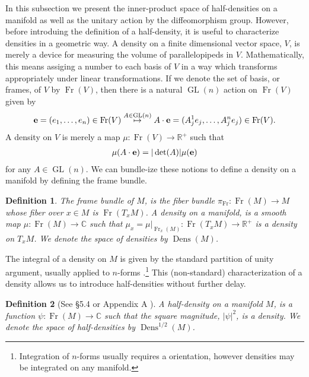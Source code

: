 \documentclass[12pt]{amsart}
\newtheorem{defn}{Definition}
\DeclareMathOperator{\GL}{GL}
\DeclareMathOperator{\Fr}{Fr}
\DeclareMathOperator{\Dens}{Dens}
\begin{document}
In this subsection we present the inner-product space of half-densities
on a manifold
as well as the unitary action by the diffeomorphism group.
However, before introduing the definition of a half-density, it is useful
to characterize densities in a geometric way.
A density on a finite dimensional vector space, $V$,
is merely a device for measuring the volume of parallelopipeds in $V$.
Mathematically, this means assiging a number to each basis of $V$
in a way which transforms appropriately under linear transformations.
If we denote the set of basis, or frames, of $V$ by $\Fr(V)$,
 then there is a natural $\GL(n)$ action on $\Fr(V)$ given by
 \begin{align*}
  {\bf e} = (e_1,\dots,e_n) \in \Fr(V) \stackrel{A \in \GL(n)}{\mapsto} A \cdot {\bf e} = (A_j^1 e_j, \dots, A_j^n e_j) \in \Fr(V).
 \end{align*}
A density on $V$ is merely a map $\mu: \Fr(V) \to \mathbb{R}^+$ such that
\begin{align*}
  \mu( A \cdot {\bf e} ) =  | \det(A) | \mu( {\bf e})
\end{align*}
for any $A \in \GL(n)$.
We can bundle-ize these notions to define a density on a manifold by defining the frame bundle.
\begin{defn}
  The \emph{frame bundle} of $M$, is the fiber bundle $\pi_{\Fr}:\Fr(M) \to M$ whose fiber over $x \in M$ is $\Fr( T_x M)$.
A \emph{density} on a manifold, is a smooth map $\mu:\Fr(M) \to \mathbb{C}$ such that $\mu_x = \left. \mu \right|_{ \Fr_x(M)} : \Fr(T_xM) \to \mathbb{R}^+$ is a density on $T_xM$.
We denote the space of densities by $\Dens(M)$.
\end{defn}
 The integral of a density on $M$ is given by the standard partition of unity argument, usually applied to $n$-forms \cite[Chapter 14]{Lee2006}.\footnote{Integration of $n$-forms usually requires a orientation, however densities may be integrated on any manifold.}
This (non-standard) characterization of a density allows us to introduce half-densities without further delay.

\begin{defn}
  [See \S 5.4 \cite{GuilleminSternberg1970} or Appendix A \cite{BatesWeinstein1997}]
  A half-density on a manifold $M$, is a function $\psi : \Fr(M) \to \mathbb{C}$ such that the square magnitude, $|\psi|^2$, is a density.
We denote the space of half-densities by $\Dens^{1/2}(M)$.
\end{defn}
\end{document}
